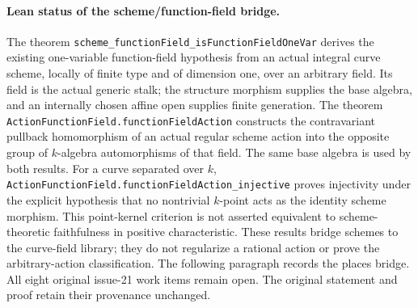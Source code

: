 \documentclass[11pt,oneside]{article}
\theoremstyle{definition}
\theoremstyle{remark}
\newcommand{\lean}[1]{\nolinkurl{#1}}
\begin{document}
\paragraph{Lean status of the scheme/function-field bridge.}
The theorem \lean{scheme_functionField_isFunctionFieldOneVar} derives the existing
one-variable function-field hypothesis from an actual integral curve scheme, locally
of finite type and of dimension one, over an arbitrary field. Its field is the actual
generic stalk; the structure morphism supplies the base algebra, and an internally
chosen affine open supplies finite generation. The theorem
\lean{ActionFunctionField.functionFieldAction} constructs the contravariant pullback
homomorphism of an actual regular scheme action into the opposite group of
$k$-algebra automorphisms of that field. The same base algebra is used by both results.
For a curve separated over $k$, \lean{ActionFunctionField.functionFieldAction_injective}
proves injectivity under the explicit hypothesis that no nontrivial $k$-point acts as
the identity scheme morphism. This point-kernel criterion is not asserted equivalent
to scheme-theoretic faithfulness in positive characteristic. These results bridge
schemes to the curve-field library; they do not regularize a rational action or prove
the arbitrary-action classification. The following paragraph records the places bridge. All eight original
issue-21 work items remain open. The original statement and proof retain their
provenance unchanged.
\end{document}
